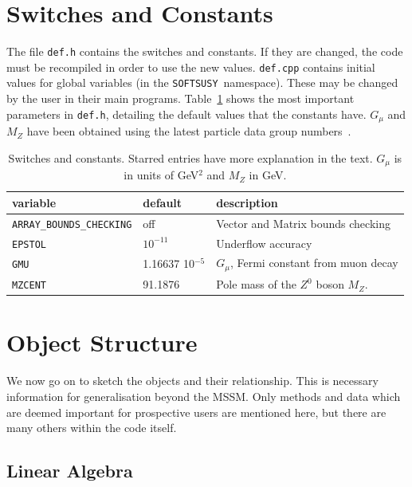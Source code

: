 \documentclass{article}
\def\SOFTSUSY{{\tt SOFTSUSY}}
\def\code#1{\small{\tt #1}\normalsize}
\begin{document}
\section{Switches and Constants \label{sec:switches}}
The file \code{def.h} contains the switches and constants. If they are
changed, the code must be 
recompiled in order to use the new values. \code{def.cpp} contains initial
values for global variables (in the \SOFTSUSY~namespace). These may be changed
by the user in their main programs. 
Table~\ref{tab:switches} shows the
most important parameters in 
\code{def.h}, detailing the default values that the constants have.
$G_\mu$ and $M_Z$ have been obtained using the latest particle
data group numbers~\cite{Groom:2000in}. \vspace{1cm}
\begin{table}\begin{center}
\begin{tabular}{lll}
variable & default & description \\ \hline
\code{ARRAY\_BOUNDS\_CHECKING} & off & Vector and Matrix bounds checking\\
\code{EPSTOL} & $10^{-11}$ & Underflow accuracy\\
\code{GMU} & 1.16637 10$^{-5}$ & $G_\mu$, Fermi constant from muon decay\\
\code{MZCENT} & 91.1876 & Pole mass of the $Z^0$ boson $M_Z$.\\
\end{tabular}\caption{ \label{tab:switches} Switches and constants. Starred entries have more explanation in the text.
$G_\mu$ is in units of GeV$^2$ and $M_Z$ in GeV.} \end{center}\end{table}

\section{Object Structure\label{sec:objects}}

We now go on to sketch the objects and their relationship. This is necessary
information for generalisation beyond the MSSM\@.
Only methods and data which are deemed important for prospective users are
mentioned here, but there are many others within the code itself.

\subsection{Linear Algebra}
\end{document}
